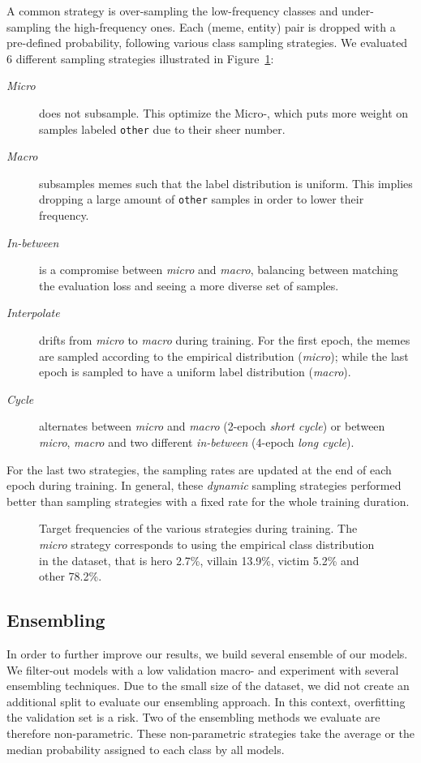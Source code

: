 A common strategy is over-sampling the low-frequency classes and under-sampling the high-frequency ones. Each (meme, entity) pair is dropped with a pre-defined probability, following various class sampling strategies.
We evaluated 6 different sampling strategies illustrated in Figure~\ref{fig:sampling}:
\begin{description}
	\item[\textsl{Micro}] does not subsample.
    This optimize the Micro-\fone{}, which puts more weight on samples labeled \texttt{other} due to their sheer number.
	\item[\textsl{Macro}] subsamples memes such that the label distribution is uniform.
    This implies dropping a large amount of \texttt{other} samples in order to lower their frequency.
	\item[\textsl{In-between}] is a compromise between \textsl{micro} and \textsl{macro}, balancing between matching the evaluation loss and seeing a more diverse set of samples.
	\item[\textsl{Interpolate}] drifts from \textsl{micro} to \textsl{macro} during training.
	For the first epoch, the memes are sampled according to the empirical distribution (\textsl{micro}); while the last epoch is sampled to have a uniform label distribution (\textsl{macro}).
	\item[\textsl{Cycle}] alternates between \textsl{micro} and \textsl{macro} (2-epoch \textsl{short cycle}) or between \textsl{micro}, \textsl{macro} and two different \textsl{in-between} (4-epoch \textsl{long cycle}).
\end{description}

For the last two strategies, the sampling rates are updated at the end of each epoch during training.
In general, these \emph{dynamic} sampling strategies performed better than sampling strategies with a fixed rate for the whole training duration.

\begin{figure}
	\centering
	
	\caption{
		Target frequencies of the various strategies during training.
		The \textsl{micro} strategy corresponds to using the empirical class distribution in the dataset, that is hero 2.7\%, villain 13.9\%, victim 5.2\% and other 78.2\%.}
	\label{fig:sampling}
\end{figure}

\subsection{Ensembling}
\label{sec:ensembling}
In order to further improve our results, we build several ensemble of our models.
We filter-out models with a low validation macro-\fone{} and experiment with several ensembling techniques.
Due to the small size of the dataset, we did not create an additional split to evaluate our ensembling approach.
In this context, overfitting the validation set is a risk.
Two of the ensembling methods we evaluate are therefore non-parametric.
These non-parametric strategies take the average or the median probability assigned to each class by all models.

